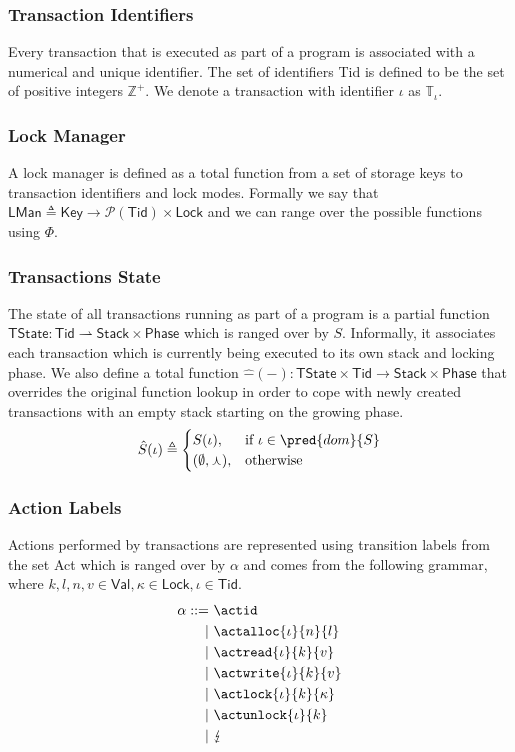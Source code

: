 \subsubsection{Transaction Identifiers}

Every transaction that is executed as part of a program is associated with a numerical and unique identifier. The set of identifiers \textsf{Tid} is defined to be the set of positive integers $\mathds{Z}^+$. We denote a transaction with identifier $\iota$ as $\mathds{T}_\iota$.

\subsubsection{Lock Manager}

A lock manager is defined as a total function from a set of storage keys to transaction identifiers and lock modes. Formally we say that $\mathsf{LMan} \triangleq \mathsf{Key} \rightarrow \mathcal{P}(\mathsf{Tid}) \times \mathsf{Lock}$ and we can range over the possible functions using $\Phi$.

\subsubsection{Transactions State}

The state of all transactions running as part of a program is a partial function $\mathsf{TState} : \mathsf{Tid} \rightharpoonup \mathsf{Stack} \times \mathsf{Phase}$ which is ranged over by $S$. Informally, it associates each transaction which is currently being executed to its own stack and locking phase. We also define a total function $\hat{-}(-) : \mathsf{TState} \times \mathsf{Tid} \rightarrow \mathsf{Stack} \times \mathsf{Phase}$ that overrides the original function lookup in order to cope with newly created transactions with an empty stack starting on the growing phase.
\[
\hat{S}(\iota) \triangleq \begin{cases}
S(\iota), & \text{if } \iota \in \pred{dom}{S} \\
(\emptyset, \curlywedge), & \text{otherwise}
\end{cases}
\]

\subsubsection{Action Labels}

Actions performed by transactions are represented using transition labels from the set \textsf{Act} which is ranged over by $\alpha$ and comes from the following grammar, where $k, l, n, v \in \mathsf{Val}, \kappa \in \mathsf{Lock}, \iota \in \mathsf{Tid}$.
\begin{align*}
\alpha ::=&
\ \actid \\
|&\ \actalloc{\iota}{n}{l} \\
|&\ \actread{\iota}{k}{v} \\
|&\ \actwrite{\iota}{k}{v} \\
|&\ \actlock{\iota}{k}{\kappa} \\
|&\ \actunlock{\iota}{k} \\
|&\ \lightning
\end{align*}

